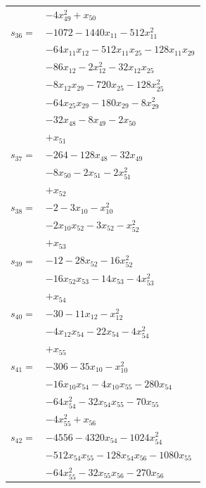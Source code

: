 \begin{longtable}{@{}r@{\;}l@{}}
 & \(\displaystyle -4x_{49}^{2} +x_{50}\) \\[3pt]
\(s_{36}=\) & \(\displaystyle -1072 -1440x_{11} -512x_{11}^{2}\) \\
 & \(\displaystyle -64x_{11}x_{12} -512x_{11}x_{25} -128x_{11}x_{29}\) \\
 & \(\displaystyle -86x_{12} -2x_{12}^{2} -32x_{12}x_{25}\) \\
 & \(\displaystyle -8x_{12}x_{29} -720x_{25} -128x_{25}^{2}\) \\
 & \(\displaystyle -64x_{25}x_{29} -180x_{29} -8x_{29}^{2}\) \\
 & \(\displaystyle -32x_{48} -8x_{49} -2x_{50}\) \\
 & \(\displaystyle +x_{51}\) \\[3pt]
\(s_{37}=\) & \(\displaystyle -264 -128x_{48} -32x_{49}\) \\
 & \(\displaystyle -8x_{50} -2x_{51} -2x_{51}^{2}\) \\
 & \(\displaystyle +x_{52}\) \\[3pt]
\(s_{38}=\) & \(\displaystyle -2 -3x_{10} -x_{10}^{2}\) \\
 & \(\displaystyle -2x_{10}x_{52} -3x_{52} -x_{52}^{2}\) \\
 & \(\displaystyle +x_{53}\) \\[3pt]
\(s_{39}=\) & \(\displaystyle -12 -28x_{52} -16x_{52}^{2}\) \\
 & \(\displaystyle -16x_{52}x_{53} -14x_{53} -4x_{53}^{2}\) \\
 & \(\displaystyle +x_{54}\) \\[3pt]
\(s_{40}=\) & \(\displaystyle -30 -11x_{12} -x_{12}^{2}\) \\
 & \(\displaystyle -4x_{12}x_{54} -22x_{54} -4x_{54}^{2}\) \\
 & \(\displaystyle +x_{55}\) \\[3pt]
\(s_{41}=\) & \(\displaystyle -306 -35x_{10} -x_{10}^{2}\) \\
 & \(\displaystyle -16x_{10}x_{54} -4x_{10}x_{55} -280x_{54}\) \\
 & \(\displaystyle -64x_{54}^{2} -32x_{54}x_{55} -70x_{55}\) \\
 & \(\displaystyle -4x_{55}^{2} +x_{56}\) \\[3pt]
\(s_{42}=\) & \(\displaystyle -4556 -4320x_{54} -1024x_{54}^{2}\) \\
 & \(\displaystyle -512x_{54}x_{55} -128x_{54}x_{56} -1080x_{55}\) \\
 & \(\displaystyle -64x_{55}^{2} -32x_{55}x_{56} -270x_{56}\) \\

\end{longtable}
